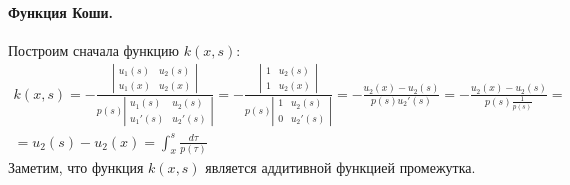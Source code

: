 \documentclass[a4paper,12pt]{article} %
\begin{document}
\paragraph{Функция Коши.}
Построим сначала функцию $k(x, s)$:
\begin{multline}
	k(x,s) =
	- \frac{
		\left|\begin{array}{cc}
			u_1(s)  & u_2(s) \\
			u_1(x)  & u_2(x)
		\end{array}\right|
	}{
		p(s)
		\left|\begin{array}{cc}
			u_1 (s) & u_2 (s) \\
			u_1'(s) & u_2'(s)
		\end{array}\right|
	}
	=
	- \frac{
		\left|\begin{array}{cc}
			1  & u_2(s) \\
			1  & u_2(x)
		\end{array}\right|
	}{
		p(s)
		\left|\begin{array}{cc}
			1 & u_2 (s) \\
			0 & u_2'(s)
		\end{array}\right|
	}
	=
	- \frac{
		u_2(x) - u_2(s)
	}{
		p(s) u_2'(s)
	}
	=
	- \frac{
		u_2(x) - u_2(s)
	}{
		p(s) \frac{1}{p(s)}
	}
	=
	\\=
	u_2(s) - u_2(x)
	=
	\int_x^s\frac{d\tau}{p(\tau)}
\end{multline}
Заметим, что функция $k(x,s)$ является аддитивной функцией промежутка.
\end{document}
